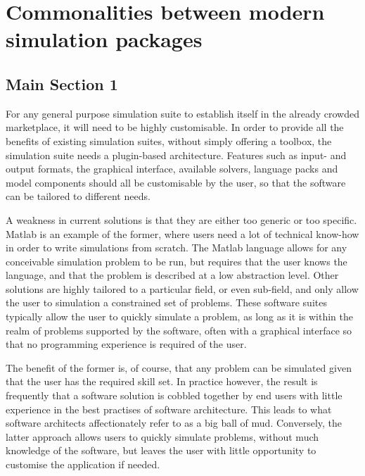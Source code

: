 
\chapter{Commonalities between modern simulation packages} %

\label{Chapter02} %


\section{Main Section 1}

For any general purpose simulation suite to establish itself in the already
crowded marketplace, it will need to be highly customisable. In order to
provide all the benefits of existing simulation suites, without simply offering
a toolbox, the simulation suite needs a plugin-based architecture. Features
such as input- and output formats, the graphical interface, available solvers,
language packs and model components should all be customisable by the user, so
that the software can be tailored to different needs.

A weakness in current solutions is that they are either too generic or too
specific. Matlab is an example of the former, where users need a lot of
technical know-how in order to write simulations from scratch. The Matlab
language allows for any conceivable simulation problem to be run, but requires
that the user knows the language, and that the problem is described at a low
abstraction level. Other solutions are highly tailored to a particular field,
or even sub-field, and only allow the user to simulation a constrained set of
problems. These software suites typically allow the user to quickly simulate a
problem, as long as it is within the realm of problems supported by the
software, often with a graphical interface so that no programming experience is
required of the user.

The benefit of the former is, of course, that any problem can be simulated
given that the user has the required skill set. In practice however, the result
is frequently that a software solution is cobbled together by end users with
little experience in the best practises of software architecture. This leads to
what software architects affectionately refer to as a big ball of mud.
Conversely, the latter approach allows users to quickly simulate problems,
without much knowledge of the software, but leaves the user with little
opportunity to customise the application if needed.

